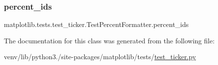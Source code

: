\subsubsection{\texorpdfstring{percent\+\_\+ids}{percent\_ids}}
{\footnotesize\ttfamily matplotlib.\+tests.\+test\+\_\+ticker.\+Test\+Percent\+Formatter.\+percent\+\_\+ids\hspace{0.3cm}{\ttfamily [static]}}



The documentation for this class was generated from the following file\+:\begin{DoxyCompactItemize}
\item 
venv/lib/python3./site-\/packages/matplotlib/tests/\hyperlink{test__ticker_8py}{test\+\_\+ticker.\+py}\end{DoxyCompactItemize}
